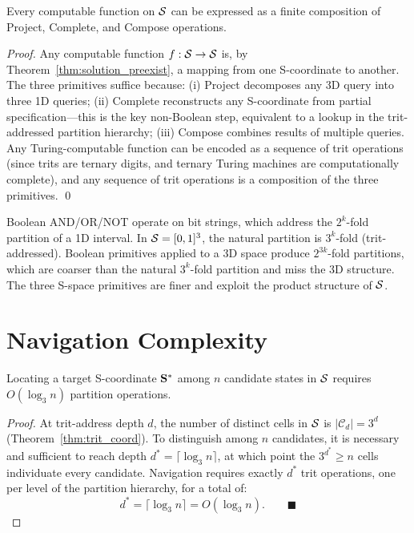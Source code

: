 \begin{proposition}
\label{prop:primitive_completeness}
Every computable function on $\mathcal{S}$ can be expressed as a finite composition
of Project, Complete, and Compose operations.
\end{proposition}

\begin{proof}
Any computable function $f: \mathcal{S} \to \mathcal{S}$ is, by
Theorem~\ref{thm:solution_preexist}, a mapping from one S-coordinate to another.
The three primitives suffice because:
(i) Project decomposes any 3D query into three 1D queries;
(ii) Complete reconstructs any S-coordinate from partial specification---this
is the key non-Boolean step, equivalent to a lookup in the trit-addressed
partition hierarchy;
(iii) Compose combines results of multiple queries.
Any Turing-computable function can be encoded as a sequence of trit
operations (since trits are ternary digits, and ternary Turing machines are
computationally complete), and any sequence of trit operations is a composition
of the three primitives. \qed
\end{proof}

\begin{remark}
Boolean AND/OR/NOT operate on bit strings, which address the $2^k$-fold
partition of a 1D interval. In $\mathcal{S} = [0,1]^3$, the natural partition is
$3^k$-fold (trit-addressed). Boolean primitives applied to a 3D space produce
$2^{3k}$-fold partitions, which are coarser than the natural $3^k$-fold
partition and miss the 3D structure. The three S-space primitives are finer
and exploit the product structure of $\mathcal{S}$.
\end{remark}

\section{Navigation Complexity}
\label{sec:navigation_complexity}

\begin{theorem}
\label{thm:navigation_complexity}
Locating a target S-coordinate $\mathbf{S}^*$ among $n$ candidate states in
$\mathcal{S}$ requires $O(\log_3 n)$ partition operations.
\end{theorem}

\begin{proof}
At trit-address depth $d$, the number of distinct cells in $\mathcal{S}$ is
$|\mathcal{C}_d| = 3^d$ (Theorem~\ref{thm:trit_coord}). To distinguish among
$n$ candidates, it is necessary and sufficient to reach depth $d^* = \lceil \log_3 n \rceil$,
at which point the $3^{d^*} \geq n$ cells individuate every candidate.
Navigation requires exactly $d^*$ trit operations, one per level of the
partition hierarchy, for a total of:
\begin{equation}
  d^* = \lceil \log_3 n \rceil = O(\log_3 n). \qquad\blacksquare
\end{equation}
\end{proof}

